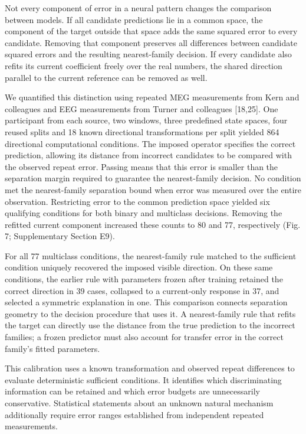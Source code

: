 \documentclass[11pt,a4paper]{article}
\begin{document}
Not every component of error in a neural pattern changes the comparison
between models. If all candidate predictions lie in a common space, the
component of the target outside that space adds the same squared error
to every candidate. Removing that component preserves all differences
between candidate squared errors and the resulting nearest-family
decision. If every candidate also refits its current coefficient freely
over the real numbers, the shared direction parallel to the current
reference can be removed as well.

We quantified this distinction using repeated MEG measurements from Kern
and colleagues and EEG measurements from Turner and colleagues
{[}18,25{]}. One participant from each source, two windows, three
predefined state spaces, four reused splits and 18 known directional
transformations per split yielded 864 directional computational
conditions. The imposed operator specifies the correct prediction,
allowing its distance from incorrect candidates to be compared with the
observed repeat error. Passing means that this error is smaller than the
separation margin required to guarantee the nearest-family decision. No
condition met the nearest-family separation bound when error was
measured over the entire observation. Restricting error to the common
prediction space yielded six qualifying conditions for both binary and
multiclass decisions. Removing the refitted current component increased
these counts to 80 and 77, respectively (Fig. 7; Supplementary Section
E9).

For all 77 multiclass conditions, the nearest-family rule matched to the
sufficient condition uniquely recovered the imposed visible direction.
On these same conditions, the earlier rule with parameters frozen after
training retained the correct direction in 39 cases, collapsed to a
current-only response in 37, and selected a symmetric explanation in
one. This comparison connects separation geometry to the decision
procedure that uses it. A nearest-family rule that refits the target can
directly use the distance from the true prediction to the incorrect
families; a frozen predictor must also account for transfer error in the
correct family's fitted parameters.

This calibration uses a known transformation and observed repeat
differences to evaluate deterministic sufficient conditions. It
identifies which discriminating information can be retained and which
error budgets are unnecessarily conservative. Statistical statements
about an unknown natural mechanism additionally require error ranges
established from independent repeated measurements.
\end{document}
